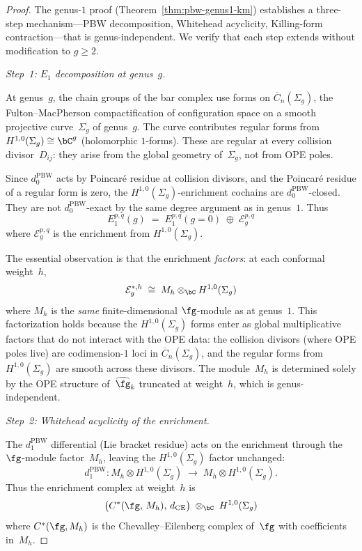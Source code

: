 \begin{proof}
The genus-$1$ proof
(Theorem~\ref{thm:pbw-genus1-km}) establishes a
three-step mechanism---PBW decomposition, Whitehead
acyclicity, Killing-form contraction---that is
genus-independent.  We verify that each step
extends without modification to $g \geq 2$.

\medskip
\emph{Step~1: $E_1$ decomposition at genus~$g$.}

At genus~$g$, the chain groups of the bar complex use
forms on $\overline{C}_n(\Sigma_g)$, the
Fulton--MacPherson compactification of configuration
space on a smooth projective curve~$\Sigma_g$ of
genus~$g$.  The curve contributes regular forms
from $H^{1,0}(\Sigma_g) \cong \bC^g$ (holomorphic
$1$-forms).  These are regular at every collision
divisor~$D_{ij}$: they arise from the global geometry
of~$\Sigma_g$, not from OPE poles.

Since $d_0^{\mathrm{PBW}}$ acts by Poincar\'{e} residue at
collision divisors, and the Poincar\'{e} residue of a
regular form is zero, the $H^{1,0}(\Sigma_g)$-enrichment
cochains are $d_0^{\mathrm{PBW}}$-closed.  They are not
$d_0^{\mathrm{PBW}}$-exact by the same degree argument
as in genus~$1$.  Thus
\begin{equation}\label{eq:e1-decomposition-genusg}
E_1^{p,q}(g) \;=\; E_1^{p,q}(g{=}0)
  \;\oplus\; \mathcal{E}^{p,q}_g
\end{equation}
where $\mathcal{E}^{p,q}_g$ is the enrichment from
$H^{1,0}(\Sigma_g)$.

The essential observation is that the enrichment
\emph{factors}: at each conformal weight~$h$,
\begin{equation}\label{eq:enrichment-factorization}
\mathcal{E}_g^{*,h}
\;\cong\; M_h \otimes_{\bC} H^{1,0}(\Sigma_g)
\end{equation}
where $M_h$ is the \emph{same} finite-dimensional
$\fg$-module as at genus~$1$.
This factorization holds because the
$H^{1,0}(\Sigma_g)$ forms enter as global
multiplicative factors that do not interact with the
OPE data: the collision divisors (where OPE poles live)
are codimension-$1$ loci in $\overline{C}_n(\Sigma_g)$,
and the regular forms from $H^{1,0}(\Sigma_g)$ are
smooth across these divisors.  The module~$M_h$ is
determined solely by the OPE structure of~$\widehat{\fg}_k$
truncated at weight~$h$, which is genus-independent.

\medskip
\emph{Step~2: Whitehead acyclicity of the enrichment.}

The $d_1^{\mathrm{PBW}}$ differential (Lie bracket residue)
acts on the enrichment through the $\fg$-module factor~$M_h$,
leaving the $H^{1,0}(\Sigma_g)$ factor unchanged:
\[
d_1^{\mathrm{PBW}}\colon
M_h \otimes H^{1,0}(\Sigma_g)
\;\longrightarrow\;
M_{h} \otimes H^{1,0}(\Sigma_g).
\]
Thus the enrichment complex at weight~$h$ is
\[
\bigl(C^*(\fg,\, M_h),\, d_{\mathrm{CE}}\bigr)
\;\otimes_{\bC}\;
H^{1,0}(\Sigma_g)
\]
where $C^*(\fg, M_h)$ is the Chevalley--Eilenberg
complex of~$\fg$ with coefficients in~$M_h$.


\end{proof}
